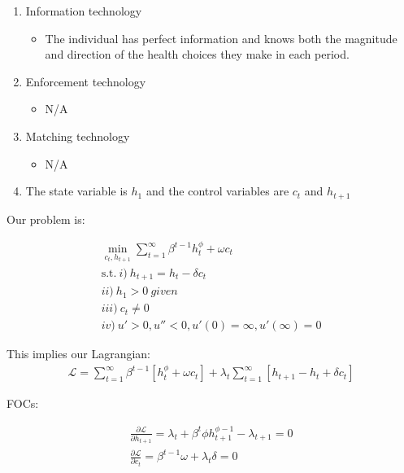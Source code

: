 \documentclass{article}[12pt]
\begin{document}
\begin{enumerate}
    \item Information technology
    \begin{itemize}
        \item The individual has perfect information and knows both the magnitude and direction of the health choices they make in each period.
    \end{itemize}
    \item Enforcement technology
    \begin{itemize}
        \item N/A
    \end{itemize}
    \item Matching technology
    \begin{itemize}
        \item N/A
    \end{itemize}
    \item The state variable is $h_1$ and the control variables are $c_t$ and $h_{t+1}$
\end{enumerate}

Our problem is:

\begin{equation}
\begin{aligned}
    \label{eq:max}
    \min_{c_t, h_{t+1}} \sum_{t=1}^\infty \beta^{t-1} h_t ^ \phi + \omega c_t \\
    \textrm{s.t.} \ i) \ h_{t+1} = h_t - \delta c_t \\
    ii) \ h_1 > 0 \ given \\
    iii) \ c_t \neq 0 \\
    iv) \ u' > 0, u'' < 0 , u'(0) = \infty, u'(\infty) = 0
\end{aligned}
\end{equation}

This implies our Lagrangian:
\begin{equation}
\begin{aligned}
    \label{eq:lagrangian}
    \mathcal{L} = \sum_{t=1}^\infty \beta^{t-1} [h_t ^ \phi + \omega c_t] +  \lambda_t \sum_{t=1}^\infty [h_{t+1} - h_t + \delta c_t]
\end{aligned}
\end{equation}

FOCs:

\begin{equation}
\begin{aligned}
    \label{eq:fonc}
    \frac{\partial \mathcal{L}}{\partial h_{t+1}} = \lambda_t + \beta ^t \phi h_{t+1} ^ {\phi - 1} - \lambda_{t+1} = 0 \\
    \frac{\partial \mathcal{L}}{\partial c_t} = \beta ^ {t-1} \omega + \lambda_t \delta  = 0 \\
\end{aligned}
\end{equation}
\end{document}
